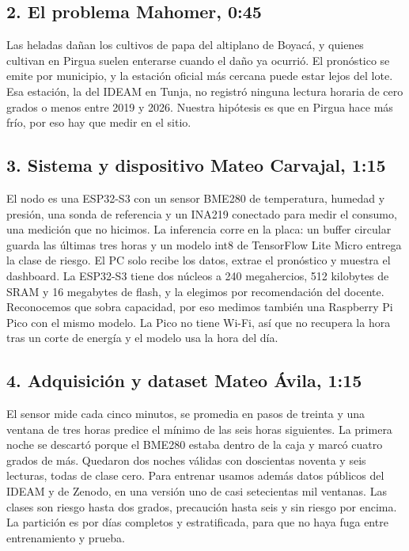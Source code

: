 \documentclass[11pt,a4paper]{article}
\begin{document}
\subsection*{2. El problema \hfill \small Mahomer, 0:45}
Las heladas dañan los cultivos de papa del altiplano de Boyacá, y quienes cultivan en Pirgua suelen enterarse cuando el daño ya ocurrió. El pronóstico se emite por municipio, y la estación oficial más cercana puede estar lejos del lote. Esa estación, la del IDEAM en Tunja, no registró ninguna lectura horaria de cero grados o menos entre 2019 y 2026. Nuestra hipótesis es que en Pirgua hace más frío, por eso hay que medir en el sitio.

\subsection*{3. Sistema y dispositivo \hfill \small Mateo Carvajal, 1:15}
El nodo es una ESP32-S3 con un sensor BME280 de temperatura, humedad y presión, una sonda de referencia y un INA219 conectado para medir el consumo, una medición que no hicimos. La inferencia corre en la placa: un buffer circular guarda las últimas tres horas y un modelo int8 de TensorFlow Lite Micro entrega la clase de riesgo. El PC solo recibe los datos, extrae el pronóstico y muestra el dashboard. La ESP32-S3 tiene dos núcleos a 240 megahercios, 512 kilobytes de SRAM y 16 megabytes de flash, y la elegimos por recomendación del docente. Reconocemos que sobra capacidad, por eso medimos también una Raspberry Pi Pico con el mismo modelo. La Pico no tiene Wi-Fi, así que no recupera la hora tras un corte de energía y el modelo usa la hora del día.

\subsection*{4. Adquisición y dataset \hfill \small Mateo Ávila, 1:15}
El sensor mide cada cinco minutos, se promedia en pasos de treinta y una ventana de tres horas predice el mínimo de las seis horas siguientes. La primera noche se descartó porque el BME280 estaba dentro de la caja y marcó cuatro grados de más. Quedaron dos noches válidas con doscientas noventa y seis lecturas, todas de clase cero. Para entrenar usamos además datos públicos del IDEAM y de Zenodo, en una versión uno de casi setecientas mil ventanas. Las clases son riesgo hasta dos grados, precaución hasta seis y sin riesgo por encima. La partición es por días completos y estratificada, para que no haya fuga entre entrenamiento y prueba.
\end{document}

